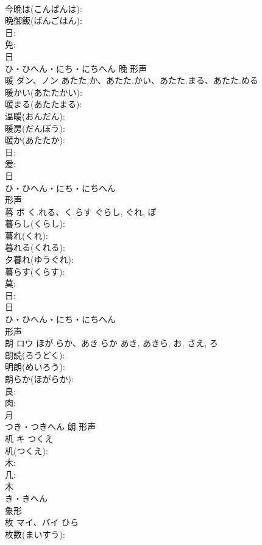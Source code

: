 \documentclass[8pt]{extreport}
\begin{document}
\begin{CJK}{UTF8}{min}
\\	今晩は(こんばんは): 
\\	晩御飯(ばんごはん): 
\\	日: 
\\	免: 
\\	日	
\\	ひ・ひへん・にち・にちへん	晚	形声 
\\	暖	ダン、ノン	あたた.か、あたた.かい、あたた.まる、あたた.める		
\\	暖かい(あたたかい): 
\\	暖まる(あたたまる): 
\\	温暖(おんだん): 
\\	暖房(だんぼう): 
\\	暖か(あたたか): 
\\	日: 
\\	爰: 
\\	日	
\\	ひ・ひへん・にち・にちへん	
\\	形声 
\\	暮	ボ	く.れる、く.らす	ぐらし, ぐれ, ぽ	
\\	暮らし(くらし): 
\\	暮れ(くれ): 
\\	暮れる(くれる): 
\\	夕暮れ(ゆうぐれ): 
\\	暮らす(くらす): 
\\	莫: 
\\	日: 
\\	日	
\\	ひ・ひへん・にち・にちへん	
\\	形声 
\\	朗	ロウ	ほが.らか、あき.らか	あき, あきら, お, さえ, ろ	
\\	朗読(ろうどく): 
\\	明朗(めいろう): 
\\	朗らか(ほがらか): 
\\	良: 
\\	肉: 
\\	月	
\\	つき・つきへん	朗	形声 
\\	机	キ	つくえ		
\\	机(つくえ): 
\\	木: 
\\	几: 
\\	木	
\\	き・きへん	
\\	象形 
\\	枚	マイ、バイ		ひら	
\\	枚数(まいすう): 

\end{CJK}
\end{document}
